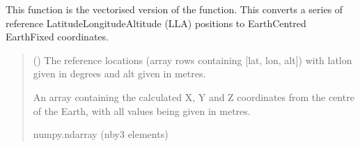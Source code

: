 \documentclass[letterpaper,10pt,english]{sphinxmanual}
\begin{document}
\begin{fulllineitems}
\label{\detokenize{modules/util/transformations:qnav.util.transformations.lla2ecef_vec}}
\pysigstartsignatures
{}
\pysigstopsignatures
\sphinxAtStartPar
This function is the vectorised version of the
{\hyperref[\detokenize{modules/util/transformations:qnav.util.transformations.lla2ecef}]{}} function. This
converts a series of reference Latitude\sphinxhyphen{}Longitude\sphinxhyphen{}Altitude (LLA) positions
to Earth\sphinxhyphen{}Centred Earth\sphinxhyphen{}Fixed coordinates.
\begin{quote}\begin{description}
\sphinxAtStartPar
{} (\sphinxstyleliteralemphasis{\sphinxupquote{ (}}\sphinxstyleliteralemphasis{\sphinxupquote{)}}) \textendash{} The reference locations (array rows containing
{[}lat, lon, alt{]}) with lat\sphinxhyphen{}lon given in degrees and alt given in
metres.

\sphinxAtStartPar
An array containing the calculated X, Y and Z coordinates from
the centre of the Earth, with all values being given in metres.

\sphinxAtStartPar
numpy.ndarray (n\sphinxhyphen{}by\sphinxhyphen{}3 elements)

\end{description}\end{quote}

\end{fulllineitems}

\end{document}
